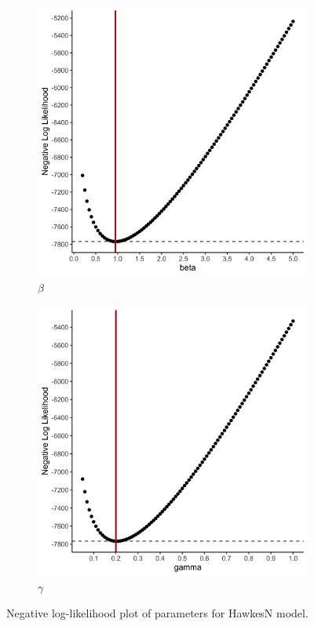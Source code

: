 \documentclass[12pt]{article}
\begin{document}
\begin{figure}
\centering
\begin{subfigure}{.5\textwidth}
  \centering
  \includegraphics[width=0.9\linewidth]{../figures/SIR_neg-log-likelihood-plot_beta.png}
  \caption{$\beta$}
\end{subfigure}%
\begin{subfigure}{.5\textwidth}
  \centering
  \includegraphics[width=0.9\linewidth]{../figures/SIR_neg-log-likelihood-plot_gamma.png}
  \caption{$\gamma$}
\end{subfigure}
\caption{Negative log-likelihood plot of parameters for HawkesN model. }\label{fig:SIR-ll}
\end{figure}
\end{document}
